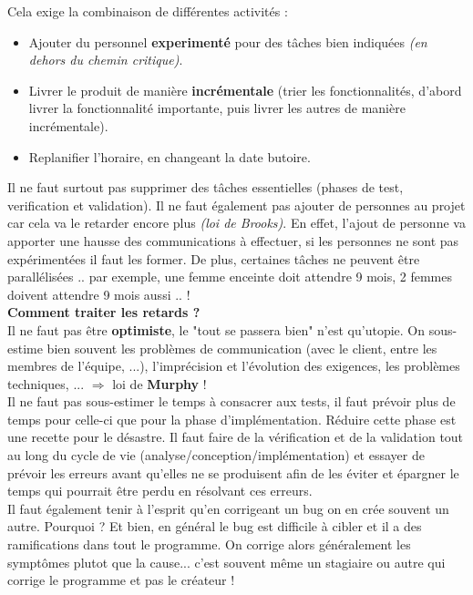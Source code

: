 \documentclass{article}
\begin{document}
\begin{sffamily}
Cela exige la combinaison de différentes activités :
\begin{itemize}
\item Ajouter du personnel \textbf{experimenté} pour des tâches bien indiquées \textit{(en dehors du chemin critique)}.
\item Livrer le produit de manière \textbf{incrémentale} (trier les fonctionnalités, d'abord livrer la fonctionnalité 
importante, puis livrer les autres de manière incrémentale).
\item Replanifier l'horaire, en changeant la date butoire.
\end{itemize}

Il ne faut surtout pas supprimer des tâches essentielles (phases de test, verification et validation). Il ne faut également pas 
ajouter de personnes au projet car cela va le retarder encore plus \textit{(loi de Brooks)}. En effet, l'ajout de personne va 
apporter une hausse des communications à effectuer, si les personnes ne sont pas expérimentées il faut les former. De plus, 
certaines tâches ne peuvent être parallélisées .. par exemple, une femme enceinte doit attendre 9 mois, 2 femmes doivent 
attendre 9 mois aussi .. ! \\

\noindent \textbf{Comment traiter les retards ?} \\

Il ne faut pas être \textbf{optimiste}, le "tout se passera bien" n'est qu'utopie. On sous-estime bien souvent les problèmes de 
communication (avec le client, entre les membres de l'équipe, ...), l'imprécision et l'évolution des exigences, les problèmes 
techniques, ... $\Rightarrow$ loi de \textbf{Murphy} ! \\

Il ne faut pas sous-estimer le temps à consacrer aux tests, il faut prévoir plus de temps pour celle-ci que pour la phase 
d'implémentation. Réduire cette phase est une recette pour le désastre. Il faut faire de la vérification et de la validation 
tout au long du cycle de vie (analyse/conception/implémentation) et essayer de prévoir les erreurs avant qu'elles ne se 
produisent afin de les éviter et épargner le temps qui pourrait être perdu en résolvant ces erreurs.\\

Il faut également tenir à l'esprit qu'en corrigeant un bug on en crée souvent un autre. Pourquoi ? Et bien, en général le bug 
est difficile à cibler et il a des ramifications dans tout le programme. On corrige alors généralement les symptômes plutot que 
la cause... c'est souvent même un stagiaire ou autre qui corrige le programme et pas le créateur ! \\


\end{sffamily}
\end{document}
